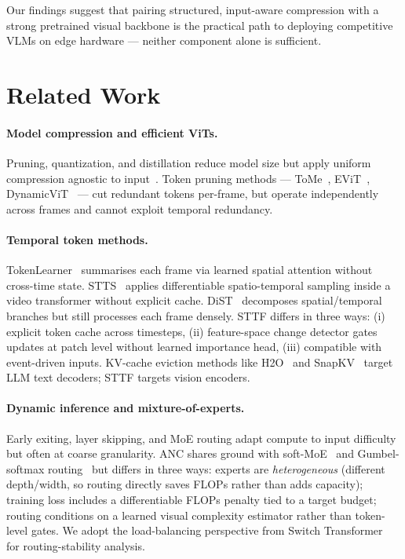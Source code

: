 \documentclass{article}
\begin{document}
Our findings suggest that pairing structured, input-aware compression with a strong pretrained visual backbone is the practical path to deploying competitive VLMs on edge hardware --- neither component alone is sufficient.


\section{Related Work}

\paragraph{Model compression and efficient ViTs.}
Pruning, quantization, and distillation reduce model size but apply uniform compression agnostic to input~\cite{han2016deepcompression, hinton2015distillation}. Token pruning methods --- ToMe~\cite{bolya2023tome}, EViT~\cite{liang2022evit}, DynamicViT~\cite{rao2021dynamicvit} --- cut redundant tokens per-frame, but operate independently across frames and cannot exploit temporal redundancy.

\paragraph{Temporal token methods.}
TokenLearner~\cite{ryoo2021tokenlearner} summarises each frame via learned spatial attention without cross-time state. STTS~\cite{wang2022stts} applies differentiable spatio-temporal sampling inside a video transformer without explicit cache. DiST~\cite{qing2023dist} decomposes spatial/temporal branches but still processes each frame densely. STTF differs in three ways: (i) explicit token cache across timesteps, (ii) feature-space change detector gates updates at patch level without learned importance head, (iii) compatible with event-driven inputs. KV-cache eviction methods like H2O~\cite{zhang2023h2o} and SnapKV~\cite{li2024snapkv} target LLM text decoders; STTF targets vision encoders.

\paragraph{Dynamic inference and mixture-of-experts.}
Early exiting, layer skipping, and MoE routing adapt compute to input difficulty but often at coarse granularity. ANC shares ground with soft-MoE~\cite{shazeer2017moe, puigcerver2024softmoe} and Gumbel-softmax routing~\cite{jang2017gumbel} but differs in three ways: experts are \emph{heterogeneous} (different depth/width, so routing directly saves FLOPs rather than adds capacity); training loss includes a differentiable FLOPs penalty tied to a target budget; routing conditions on a learned visual complexity estimator rather than token-level gates. We adopt the load-balancing perspective from Switch Transformer~\cite{fedus2022switch} for routing-stability analysis.
\end{document}
